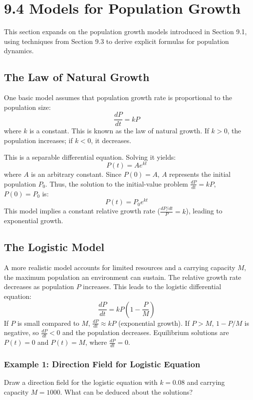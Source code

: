 \documentclass{article}
\begin{document}
\section*{9.4 Models for Population Growth}

This section expands on the population growth models introduced in Section 9.1, using techniques from Section 9.3 to derive explicit formulas for population dynamics.

\subsection*{The Law of Natural Growth}

One basic model assumes that population growth rate is proportional to the population size:
\[
\frac{dP}{dt} = kP
\]
where $k$ is a constant. 
This is known as the law of natural growth. If $k>0$, the population increases; if $k<0$, it decreases.

This is a separable differential equation. Solving it yields:
\[
P(t) = A e^{kt}
\]
where $A$ is an arbitrary constant.
Since $P(0)=A$, $A$ represents the initial population $P_0$.
Thus, the solution to the initial-value problem $\frac{dP}{dt} = kP$, $P(0)=P_0$ is:
\[
P(t) = P_0 e^{kt}
\]
This model implies a constant relative growth rate ($\frac{dP/dt}{P} = k$), leading to exponential growth.

\subsection*{The Logistic Model}

A more realistic model accounts for limited resources and a carrying capacity $M$, the maximum population an environment can sustain. 
The relative growth rate decreases as population $P$ increases. 
This leads to the logistic differential equation:
\[
\frac{dP}{dt} = kP\left(1 - \frac{P}{M}\right)
\]
If $P$ is small compared to $M$, $\frac{dP}{dt} \approx kP$ (exponential growth).
If $P > M$, $1 - P/M$ is negative, so $\frac{dP}{dt} < 0$ and the population decreases.
Equilibrium solutions are $P(t) = 0$ and $P(t) = M$, where $\frac{dP}{dt} = 0$.

\subsubsection*{Example 1: Direction Field for Logistic Equation}
Draw a direction field for the logistic equation with $k = 0.08$ and carrying capacity $M = 1000$. 
What can be deduced about the solutions?
\end{document}
